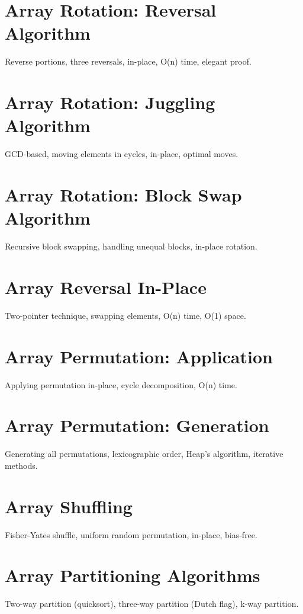 
\chapter{Array Rotation: Reversal Algorithm}
Reverse portions, three reversals, in-place, O(n) time, elegant proof.

\chapter{Array Rotation: Juggling Algorithm}
GCD-based, moving elements in cycles, in-place, optimal moves.

\chapter{Array Rotation: Block Swap Algorithm}
Recursive block swapping, handling unequal blocks, in-place rotation.

\chapter{Array Reversal In-Place}
Two-pointer technique, swapping elements, O(n) time, O(1) space.

\chapter{Array Permutation: Application}
Applying permutation in-place, cycle decomposition, O(n) time.

\chapter{Array Permutation: Generation}
Generating all permutations, lexicographic order, Heap's algorithm, iterative methods.

\chapter{Array Shuffling}
Fisher-Yates shuffle, uniform random permutation, in-place, bias-free.

\chapter{Array Partitioning Algorithms}
Two-way partition (quicksort), three-way partition (Dutch flag), k-way partition.

